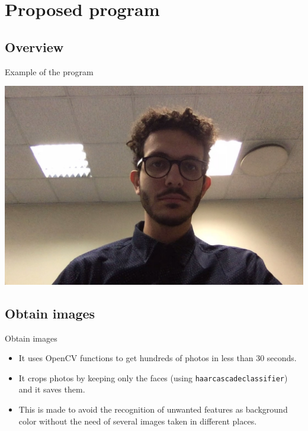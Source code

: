 \documentclass{beamer}
\begin{document}
\section{Proposed program}

\subsection{Overview}

\begin{frame}{Example of the program}
	\begin{center}
		\includegraphics[scale=0.1]{prova}
	\end{center}
\end{frame}

\subsection{Obtain images}

\begin{frame}{Obtain images}
	\begin{itemize}
		\setlength\itemsep{1em}
		[triangle]

			\item 
				It uses OpenCV functions to get hundreds of photos in less than 30 seconds.
			\item 
				It crops photos by keeping only the faces (using \texttt{haarcascadeclassifier}) and it saves them.
			\item
				This is made to avoid the recognition of unwanted features as background color without 							the need of several images taken in different places.
		
	\end{itemize}
\end{frame}
\end{document}
